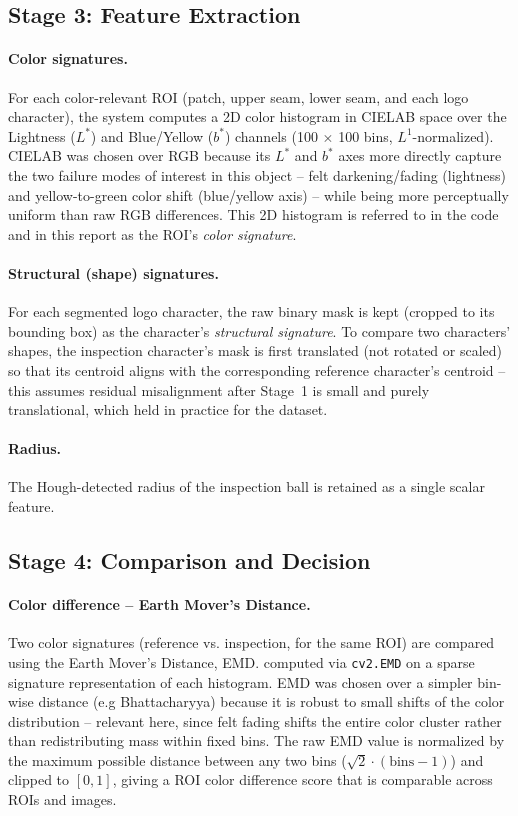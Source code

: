 \documentclass[11pt,a4paper]{article}
\begin{document}
\subsection{Stage 3: Feature Extraction}

\paragraph{Color signatures.} For each color-relevant ROI (patch, upper
seam, lower seam, and each logo character), the system computes a 2D color
histogram in CIELAB space over the Lightness ($L^{*}$) and Blue/Yellow
($b^{*}$) channels (100 $\times$ 100 bins, $L^{1}$-normalized). CIELAB was
chosen over RGB because its $L^{*}$ and $b^{*}$ axes more directly capture
the two failure modes of interest in this object -- felt darkening/fading
(lightness) and yellow-to-green color shift (blue/yellow axis) -- while
being more perceptually uniform than raw RGB differences. This 2D
histogram is referred to in the code and in this report as the ROI's
\emph{color signature}.

\paragraph{Structural (shape) signatures.} For each segmented logo
character, the raw binary mask is kept (cropped to its bounding box) as the
character's \emph{structural signature}. To compare two characters' shapes, the
inspection character's mask is first translated (not rotated or scaled) so
that its centroid aligns with the corresponding reference character's
centroid -- this assumes residual misalignment after Stage~1 is small and
purely translational, which held in practice for the dataset.

\paragraph{Radius.} The Hough-detected radius of the inspection ball is
retained as a single scalar feature.

\subsection{Stage 4: Comparison and Decision}

\paragraph{Color difference -- Earth Mover's Distance.} Two color
signatures (reference vs. inspection, for the same ROI) are compared using
the Earth Mover's Distance, EMD.
computed via \texttt{cv2.EMD} on a sparse signature representation of each
histogram. EMD was chosen over a simpler bin-wise distance (e.g Bhattacharyya) because it is robust to small shifts of the
color distribution -- relevant here, since felt fading shifts the entire
color cluster rather than redistributing mass within fixed bins. The raw
EMD value is normalized by the maximum possible distance between any two
bins ($\sqrt{2} \cdot (\text{bins}-1)$) and clipped to $[0, 1]$, giving a
ROI color difference score that is comparable across ROIs and images.
\end{document}
